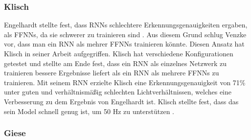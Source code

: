 \subsubsection{Klisch}
Engelhardt stellte fest, dass RNNs schlechtere Erkennungsgenauigkeiten ergaben, als FFNNs, da sie schwerer zu trainieren sind \cite{engelhardtThesis}.
Aus diesem Grund schlug Venzke vor, dass man ein RNN als mehrer FFNNs trainieren könnte. Diesen Ansatz hat Klisch in seiner Arbeit aufgegriffen. Klisch hat verschiedene Konfigurationen getestet und stellte am Ende fest,
dass ein RNN als einzelnes Netzwerk zu trainieren bessere Ergebnisse liefert als ein RNN als mehrere FFNNs zu trainieren. Mit seinem RNN erzielte Klisch eine Erkennungsgenauigkeit von 71\% unter guten und verhältnismäßig
schlechten Lichtverhältnissen, welches eine Verbesserung zu dem Ergebnis von Engelhardt ist. Klisch stellte fest, dass das sein Model schnell genug ist, um 50 Hz zu unterstützen \cite{klischThesis}.
\subsubsection{Giese}
